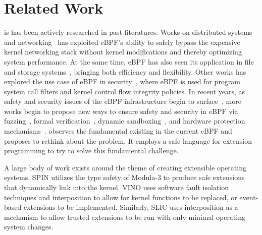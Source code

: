 \section{Related Work}

 is has been actively researched in past literatures.
Works on distributed systems and
    networking~\cite{BMC,Electrode,DINT,Hoiland-Jorgensen:conext:2018} has
    exploited eBPF's ability to safely bypass the expensive kernel networking
    stack without kernel modifications and thereby optimizing
    system performance.
At the same time, eBPF has also seen its application in file and storage
    systems~\cite{Zhong:osdi:2022}, bringing both efficiency and flexibility.
Other works has explored the use case of eBPF in
    security~\cite{jia2023,ebpf-kcfi}, where eBPF is used for program system
    call filters and kernel control flow integrity policies.
In recent years, as safety and security issues of the eBPF infrastructure begin
    to
    surface~\cite{EPF,CVE-2021-31440,CVE-2022-23222,CVE-2022-2785,
        CVE-2021-29154,CVE-2021-45402},
    more works begin to propose new ways to ensure safety and security in eBPF
    via fuzzing~\cite{hung2023brf}, formal
    verification~\cite{ebpf-jit-formal,proof-carrying-verifier},
    dynamic sandboxing~\cite{sandbpf}, and hardware protection
    mechanisms~\cite{lu2023moat,ebpf-pks}.
\projname{} observes the fundamental \gap{} existing in the current eBPF and
    proposes to rethink about the problem.
It employs a safe language for extension programming to try to solve this
    fundamental challenge.

A large body of work exists around the theme of creating extensible operating
    systems.
SPIN \cite{spin} utilizes the type safety of Modula-3 to produce
    safe extensions that dynamically link into the kernel.
VINO \cite{vino} uses software fault isolation techniques and interposition to
    allow for kernel functions to be replaced, or event-based extensions to be
    implemented.
Similarly, SLIC \cite{slic} uses interposition as a mechanism to allow trusted
    extensions to be run with only minimal operating system changes.


